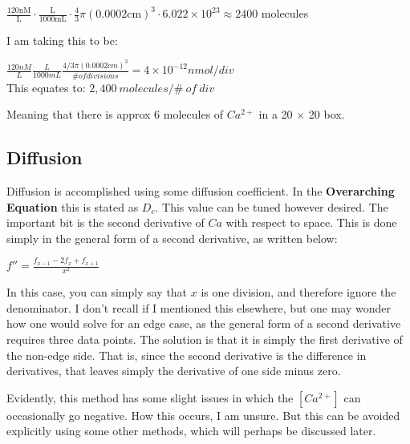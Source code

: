 \documentclass[12pt]{amsart}
\begin{document}
\bigskip

\begin{center}
    $\frac{120\mathrm{nM}}{\mathrm{L}} \cdot \frac{\mathrm{L}}{1000\mathrm{mL}} \cdot {\frac{4}{3}\pi(0.000\mathrm{2cm})^3} \cdot 6.022\times 10^{23} \approx 2400$ molecules\\
\end{center}


\bigskip

I am taking this to be: 

\bigskip

\begin{center}
    $\frac{120nM}{L}\frac{L}{1000mL}\frac{4/3\pi(0.0002cm)^3}{\# of divisions} = 4\times10^{-12} nmol/div$\\
    This equates to: 
    $2,400 \: molecules / \# \: of \: div$
\end{center}

\bigskip

Meaning that there is approx 6 molecules of $Ca^{2+}$ in a 20 $\times$ 20 box.

\subsection{Diffusion} Diffusion is accomplished using some diffusion coefficient. In the \textbf{Overarching Equation} this is stated as $D_c$. This value can be tuned however desired. The important bit is the second derivative of $Ca$ with respect to space. This is done simply in the general form of a second derivative, as written below: 

\begin{center}

    $f'' = \frac{f_{x - 1} - 2f_x + f_{x + 1}}{x^2}$
    
\end{center}

\bigskip

In this case, you can simply say that $x$ is one division, and therefore ignore the denominator. I don't recall if I mentioned this elsewhere, but one may wonder how one would solve for an edge case, as the general form of a second derivative requires three data points. The solution is that it is simply the first derivative of the non-edge side. That is, since the second derivative is the difference in derivatives, that leaves simply the derivative of one side minus zero.\newline

Evidently, this method has some slight issues in which the $[Ca^{2+}]$ can occasionally go negative. How this occurs, I am unsure. But this can be avoided explicitly using some other methods, which will perhaps be discussed later. 
\end{document}
